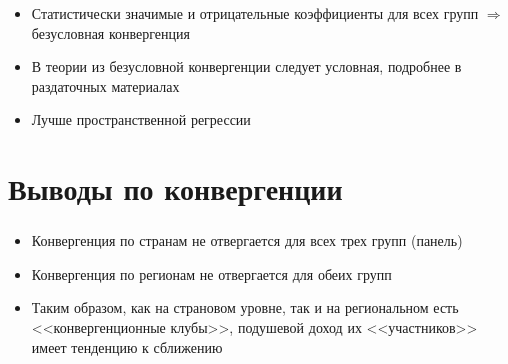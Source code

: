 \documentclass[c, dvipsnames]{beamer}  %
\begin{document}
\begin{frame}
 			\frametitle{\insertsection}
	\framesubtitle{\insertsubsection}
	\begin{itemize}
 
		\item Статистически значимые и отрицательные  коэффициенты для всех групп $\Rightarrow$ \alert{безусловная конвергенция}
		\item В теории из безусловной конвергенции следует условная, подробнее в раздаточных материалах 
			\item Лучше пространственной регрессии
	\end{itemize}
	\vspace{-3ex}
\begin{table}[!htbp] \centering 
\end{table}
\end{frame}

\section{Выводы по конвергенции}
\begin{frame}
\frametitle{\insertsection}
 
\begin{itemize}
	\item Конвергенция по странам не отвергается для всех трех групп (панель)
	\item Конвергенция по регионам не отвергается  для обеих групп 
	\item Таким образом, как на страновом уровне, так и на региональном есть <<конвергенционные клубы>>, подушевой доход их <<участников>> имеет тенденцию к сближению 
\end{itemize} 
\end{frame}
 
\end{document}
